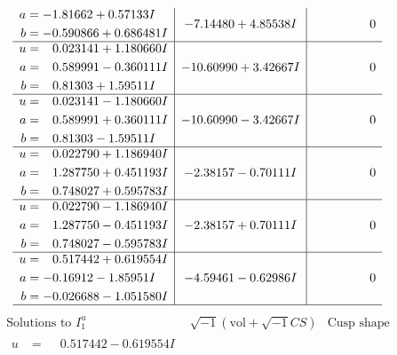 \documentclass[1p]{elsarticle_modified}
\theoremstyle{definition}
\newcommand{\I}{\sqrt{-1}}
\begin{document}
$$\begin{array}{c|c|c}
\begin{aligned}
a &= -1.81662 + 0.57133 I \\
b &= -0.590866 + 0.686481 I\end{aligned}
 & -7.14480 + 4.85538 I & \phantom{-0.000000 } 0 \\ \hline\begin{aligned}
u &= \phantom{-}0.023141 + 1.180660 I \\
a &= \phantom{-}0.589991 - 0.360111 I \\
b &= \phantom{-}0.81303 + 1.59511 I\end{aligned}
 & -10.60990 + 3.42667 I & \phantom{-0.000000 } 0 \\ \hline\begin{aligned}
u &= \phantom{-}0.023141 - 1.180660 I \\
a &= \phantom{-}0.589991 + 0.360111 I \\
b &= \phantom{-}0.81303 - 1.59511 I\end{aligned}
 & -10.60990 - 3.42667 I & \phantom{-0.000000 } 0 \\ \hline\begin{aligned}
u &= \phantom{-}0.022790 + 1.186940 I \\
a &= \phantom{-}1.287750 + 0.451193 I \\
b &= \phantom{-}0.748027 + 0.595783 I\end{aligned}
 & -2.38157 - 0.70111 I & \phantom{-0.000000 } 0 \\ \hline\begin{aligned}
u &= \phantom{-}0.022790 - 1.186940 I \\
a &= \phantom{-}1.287750 - 0.451193 I \\
b &= \phantom{-}0.748027 - 0.595783 I\end{aligned}
 & -2.38157 + 0.70111 I & \phantom{-0.000000 } 0 \\ \hline\begin{aligned}
u &= \phantom{-}0.517442 + 0.619554 I \\
a &= -0.16912 - 1.85951 I \\
b &= -0.026688 - 1.051580 I\end{aligned}
 & -4.59461 - 0.62986 I & \phantom{-0.000000 } 0\\
 \hline 
 \end{array}$$\newpage$$\begin{array}{c|c|c}  
\text{Solutions to }I^u_{1}& \I (\text{vol} + \sqrt{-1}CS) & \text{Cusp shape}\\
 \hline 
\begin{aligned}
u &= \phantom{-}0.517442 - 0.619554 I \\

\end{aligned}
\end{array}$$
\end{document}
